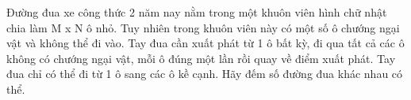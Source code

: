 Đường đua xe công thức 2 năm nay nằm trong một khuôn viên hình chữ nhật chia làm M x N ô nhỏ. Tuy nhiên trong khuôn viên này có một số ô chướng ngại vật và không thể đi vào. Tay đua cần xuất phát từ 1 ô bất kỳ, đi qua tất cả các ô không có chướng ngại vật, mỗi ô đúng một lần rồi quay về điểm xuất phát. Tay đua chỉ có thể đi từ 1 ô sang các ô kề cạnh. Hãy đếm số đường đua khác nhau có thể.  

\